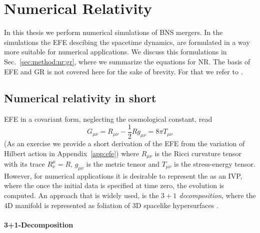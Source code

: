 \chapter{Numerical Relativity}
\label{ch:nr_methods}

In this thesis we perform numerical simulations of \ac{BNS} mergers. 
In the simulations the \ac{EFE} descibing the spacetime dynamics, are formulated in a 
way more suitable for numerical applications. We discuss this formulations in 
Sec.~\ref{sec:method:nr:gr}, where we summarize the equations for \ac{NR}.
The basis of \ac{EFE} and \ac{GR} is not covered here for the sake of brevity. For that we 
refer to 
\citet{Arnowitt:1962hi,Landau:1982dva,Wald:1984,Misner:1973,Baumgarte:2002jm}.


\section{Numerical relativity in short}


\ac{EFE} in a covariant form, neglecting the cosmological constant, read
%
\begin{equation}
    G_{\mu\nu} = R_{\mu\nu} - \frac{1}{2} R g_{\mu\nu} = 8\pi T_{\mu\nu}
\end{equation}
%
(As an exercise we provide a short derivation of the 
\ac{EFE} from the variation of Hilbert action in Appendix~\ref{app:efe})
%
where $R_{\mu\nu}$ is the Ricci curvature tensor with its trace 
$R^{\mu}_{\nu} = R$, $g_{\mu\nu}$ is the metric tensor and 
$T_{\mu\nu}$ is the stress-energy tensor.
%
However, for numerical applications it is desirable to represent the as an \ac{IVP},
where the once the initial data is specified at time zero, the evolution is computed.
An approach that is widely used, is the \textit{$3+1$ decomposition}, where the $4$D 
manifold is represented as foliation of $3$D spacelike hypersurfaces 
\cite{Alcubierre:2008,Baumgarte:2010,Gourgoulhon:2007ue,Rezzolla:2013}.


\subsubsection{3+1-Decomposition}

